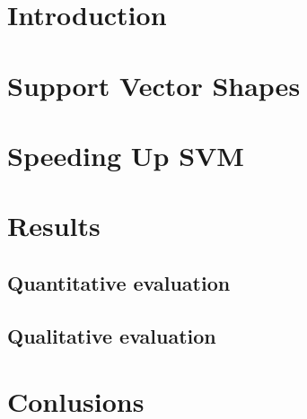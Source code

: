 \documentclass[12pt]{article}
\begin{document}
\maketitle

\section{Introduction}

\section{Support Vector Shapes}


\section{Speeding Up SVM}

\section{Results}
\subsection{Quantitative evaluation}
\subsection{Qualitative evaluation}
\section{Conlusions}



\end{document}
